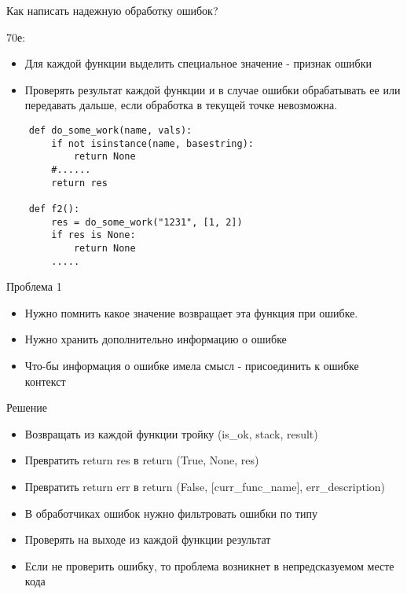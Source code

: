 \documentclass{article}
\begin{document}
\LARGE

\begin{center} Как написать надежную обработку ошибок? \end{center}
70е:
\begin{itemize}
	\item Для каждой функции выделить специальное значение - признак ошибки
	\item Проверять результат каждой функции и в случае ошибки обрабатывать
	        ее или передавать дальше, если обработка в текущей точке невозможна.
\end{itemize}
\begin{lstlisting}
	def do_some_work(name, vals):
		if not isinstance(name, basestring):
			return None
		#......
		return res

	def f2():
		res = do_some_work("1231", [1, 2])
		if res is None:
			return None
		.....
\end{lstlisting}
\newpage

\begin{center} Проблема 1 \end{center}
\begin{itemize}
	\item Нужно помнить какое значение возвращает эта функция при ошибке.
	\item Нужно хранить дополнительно информацию о ошибке
	\item Что-бы информация о ошибке имела смысл - присоединить к ошибке контекст
\end{itemize}
\newpage

\begin{center} Решение \end{center}
\begin{itemize}
	\item Возвращать из каждой функции тройку (is\_ok, stack, result)
	\item Превратить return res в return (True, None, res)
	\item Превратить return err в return (False, [curr\_func\_name], err_description)
	\item В обработчиках ошибок нужно фильтровать ошибки по типу
	\item Проверять на выходе из каждой функции результат
	\item Если не проверить ошибку, то проблема 
			возникнет в непредсказуемом месте кода
\end{itemize}
\newpage
\end{document}
